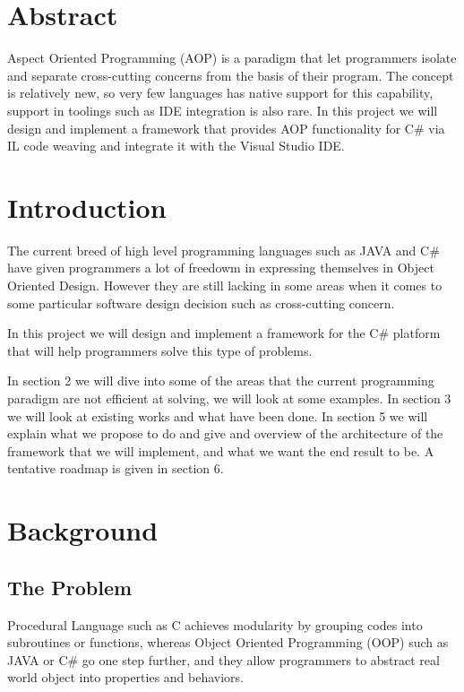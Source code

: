 \section*{Abstract}
Aspect Oriented Programming (AOP) is a paradigm that let programmers isolate and separate cross-cutting concerns from the basis of their program. The concept is relatively new, so very few languages has native support for this capability, support in toolings such as IDE integration is also rare. In this project we will design and implement a framework that provides AOP functionality for C\# via IL code weaving and integrate it with the Visual Studio IDE.
\vfill{}

\setcounter{page}{0} 
\newpage{}
\section{Introduction}
The current breed of high level programming languages such as JAVA and C\# have given programmers a lot of freedowm in expressing themselves in Object Oriented Design. However they are still lacking in some areas when it comes to some particular software design decision such as cross-cutting concern. 

In this project we will design and implement a framework for the C\# platform that will help programmers solve this type of problems.

In section 2 we will dive into some of the areas that the current programming paradigm are not efficient at solving, we will look at some examples. In section 3 we will look at existing works and what have been done. In section 5 we will explain what we propose to do and give and overview of the architecture of the framework that we will implement, and what we want the end result to be. A tentative roadmap is given in section 6.

\section{Background}
\subsection{The Problem}
Procedural Language such as C achieves modularity by grouping codes into subroutines or functions, whereas Object Oriented Programming (OOP) such as JAVA or C\# go one step further, and they allow programmers to abstract real world object into properties and behaviors.

